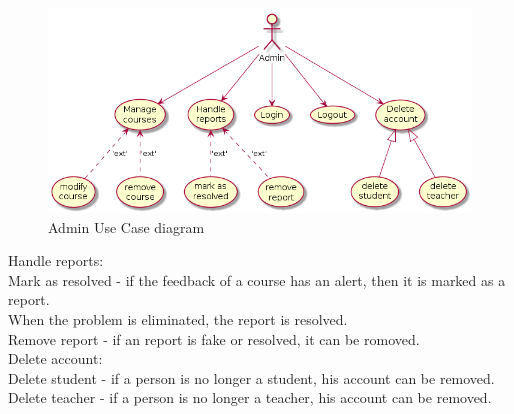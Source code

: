 \documentclass[12pt,a4paper,titlepage]{article}
\newcommand\tab[1][1cm]{\hspace*{#1}}
\begin{document}
\clearpage

\begin{figure}[H]
\includegraphics[width=\textwidth]{admin}
\caption{Admin Use Case diagram}
\centering
\end{figure}

\noindent
Handle reports:\\
\tab Mark as resolved - if the feedback of a course has an alert, then it is marked as a report.\\
\tab When the problem is eliminated, the report is resolved.\\
\tab Remove report - if an report is fake or resolved, it can be romoved.\\
Delete account:\\
\tab Delete student - if a person is no longer a student, his account can be removed.
\tab Delete teacher - if a person is no longer a teacher, his account can be removed.
\end{document}
